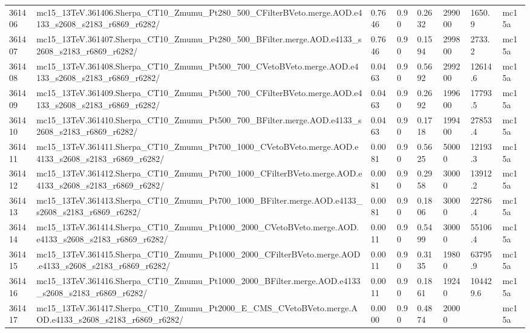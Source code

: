 \begin{sidewaystable}[!htp]
\begin{center}
{\begin{tabular}{llllllll}
361406  &  mc15\_13TeV.361406.Sherpa\_CT10\_Zmumu\_Pt280\_500\_CFilterBVeto.merge.AOD.e4133\_s2608\_s2183\_r6869\_r6282/  &  0.7646  &  0.90  &  0.2632  &  299000  &  1650.9  &  mc15a \\
361407  &  mc15\_13TeV.361407.Sherpa\_CT10\_Zmumu\_Pt280\_500\_BFilter.merge.AOD.e4133\_s2608\_s2183\_r6869\_r6282/  &  0.7646  &  0.90  &  0.1594  &  299800  &  2733.2  &  mc15a \\
361408  &  mc15\_13TeV.361408.Sherpa\_CT10\_Zmumu\_Pt500\_700\_CVetoBVeto.merge.AOD.e4133\_s2608\_s2183\_r6869\_r6282/  &  0.0463  &  0.90  &  0.5692  &  299200  &  12614.6  &  mc15a \\
361409  &  mc15\_13TeV.361409.Sherpa\_CT10\_Zmumu\_Pt500\_700\_CFilterBVeto.merge.AOD.e4133\_s2608\_s2183\_r6869\_r6282/  &  0.0463  &  0.90  &  0.2692  &  199600  &  17793.5  &  mc15a \\
361410  &  mc15\_13TeV.361410.Sherpa\_CT10\_Zmumu\_Pt500\_700\_BFilter.merge.AOD.e4133\_s2608\_s2183\_r6869\_r6282/  &  0.0463  &  0.90  &  0.1718  &  199400  &  27853.4  &  mc15a \\
361411  &  mc15\_13TeV.361411.Sherpa\_CT10\_Zmumu\_Pt700\_1000\_CVetoBVeto.merge.AOD.e4133\_s2608\_s2183\_r6869\_r6282/  &  0.0081  &  0.90  &  0.5625  &  50000  &  12193.3  &  mc15a \\
361412  &  mc15\_13TeV.361412.Sherpa\_CT10\_Zmumu\_Pt700\_1000\_CFilterBVeto.merge.AOD.e4133\_s2608\_s2183\_r6869\_r6282/  &  0.0081  &  0.90  &  0.2958  &  30000  &  13912.2  &  mc15a \\
361413  &  mc15\_13TeV.361413.Sherpa\_CT10\_Zmumu\_Pt700\_1000\_BFilter.merge.AOD.e4133\_s2608\_s2183\_r6869\_r6282/  &  0.0081  &  0.90  &  0.1806  &  30000  &  22786.4  &  mc15a \\
361414  &  mc15\_13TeV.361414.Sherpa\_CT10\_Zmumu\_Pt1000\_2000\_CVetoBVeto.merge.AOD.e4133\_s2608\_s2183\_r6869\_r6282/  &  0.0011  &  0.90  &  0.5499  &  30000  &  55106.4  &  mc15a \\
361415  &  mc15\_13TeV.361415.Sherpa\_CT10\_Zmumu\_Pt1000\_2000\_CFilterBVeto.merge.AOD.e4133\_s2608\_s2183\_r6869\_r6282/  &  0.0011  &  0.90  &  0.3135  &  19800  &  63795.9  &  mc15a \\
361416  &  mc15\_13TeV.361416.Sherpa\_CT10\_Zmumu\_Pt1000\_2000\_BFilter.merge.AOD.e4133\_s2608\_s2183\_r6869\_r6282/  &  0.0011  &  0.90  &  0.1861  &  19240  &  104429.6  &  mc15a \\
361417  &  mc15\_13TeV.361417.Sherpa\_CT10\_Zmumu\_Pt2000\_E\_CMS\_CVetoBVeto.merge.AOD.e4133\_s2608\_s2183\_r6869\_r6282/  &  0.0000  &  0.90  &  0.4874  &  20000  &   &  mc15a \\

\end{tabular}}
\end{center}
\end{sidewaystable}
